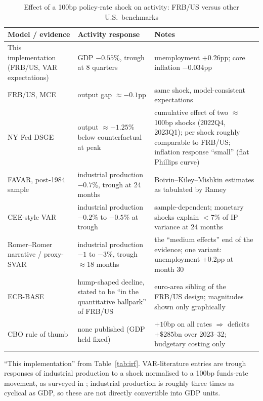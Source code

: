 \begin{table}[htbp]
\centering
\caption{Effect of a 100bp policy-rate shock on activity: FRB/US versus other U.S.\ benchmarks}
\label{tab:crossmodel}
\footnotesize
\begin{tabularx}{\textwidth}{>{\raggedright\arraybackslash}p{}>{\raggedright\arraybackslash}p{}>{\raggedright\arraybackslash}X}
\toprule
Model / evidence & Activity response & Notes \\
\midrule
This implementation (FRB/US, VAR expectations) & GDP $-0.55\%$, trough at 8 quarters & unemployment $+0.26$pp; core inflation $-0.034$pp \\
FRB/US, MCE \citep{brayton2014note} & output gap $\approx-0.1$pp & same shock, model-consistent expectations \\
NY Fed DSGE \citep{delnegro2023lagged} & output $\approx-1.25\%$ below counterfactual at peak & cumulative effect of two $\approx$100bp shocks (2022Q4, 2023Q1); per shock roughly comparable to FRB/US; inflation response ``small'' (flat Phillips curve) \\
FAVAR, post-1984 sample \citep{ramey2016shocks} & industrial production $-0.7\%$, trough at 24 months & Boivin--Kiley--Mishkin estimates as tabulated by Ramey \\
CEE-style VAR \citep{ramey2016shocks} & industrial production $-0.2\%$ to $-0.5\%$ at trough & sample-dependent; monetary shocks explain $<$7\% of IP variance at 24 months \\
Romer--Romer narrative / proxy-SVAR \citep{ramey2016shocks} & industrial production $-1$ to $-3\%$, trough $\approx$18 months & the ``medium effects'' end of the evidence; one variant: unemployment $+0.2$pp at month 30 \\
ECB-BASE \citep{angelini2019ecbbase} & hump-shaped decline, stated to be ``in the quantitative ballpark'' of FRB/US & euro-area sibling of the FRB/US design; magnitudes shown only graphically \\
CBO rule of thumb \citep{cbo2022rules} & none published (GDP held fixed) & $+10$bp on all rates $\Rightarrow$ deficits $+\$285$bn over 2023--32; budgetary costing only \\
\bottomrule
\end{tabularx}

\medskip
\parbox{0.97\textwidth}{\footnotesize ``This implementation'' from Table~\ref{tab:irf}. VAR-literature entries are trough responses of industrial production to a shock normalised to a 100bp funds-rate movement, as surveyed in \citet{ramey2016shocks}; industrial production is roughly three times as cyclical as GDP, so these are not directly convertible into GDP units.}
\end{table}

